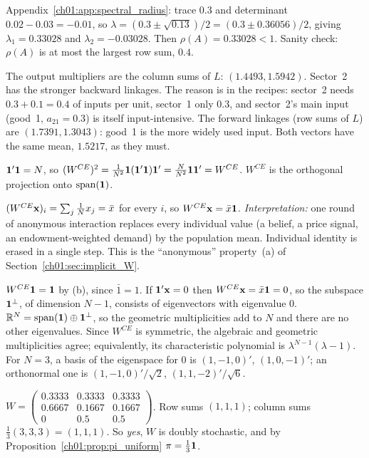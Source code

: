 \documentclass[../solutions_manual.tex]{subfiles}
\begin{document}
 Appendix~\ref{ch01:app:spectral_radius}: trace $0.3$ and determinant $0.02 - 0.03 = -0.01$, so $\lambda = (0.3 \pm \sqrt{0.13})/2 = (0.3 \pm 0.36056)/2$, giving $\lambda_1 = 0.33028$ and $\lambda_2 = -0.03028$. Then $\rho(A) = 0.33028 < 1$. Sanity check: $\rho(A)$ is at most the largest row sum, $0.4$.

 The output multipliers are the column sums of $L$: $(1.4493, 1.5942)$. Sector~2 has the stronger backward linkages. The reason is in the recipes: sector~2 needs $0.3 + 0.1 = 0.4$ of inputs per unit, sector~1 only $0.3$, and sector~2's main input (good~1, $a_{21} = 0.3$) is itself input-intensive. The forward linkages (row sums of $L$) are $(1.7391, 1.3043)$: good~1 is the more widely used input. Both vectors have the same mean, $1.5217$, as they must.


 $\mathbf{1}'\mathbf{1} = N$, so $(W^{CE})^2 = \frac{1}{N^2}\mathbf{1}(\mathbf{1}'\mathbf{1})\mathbf{1}' = \frac{N}{N^2}\mathbf{1}\mathbf{1}' = W^{CE}$. $W^{CE}$ is the orthogonal projection onto $\operatorname{span}(\mathbf{1})$.

 $(W^{CE}\mathbf{x})_i = \sum_j \frac1N x_j = \bar x$ for every $i$, so $W^{CE}\mathbf{x} = \bar x\mathbf{1}$. \emph{Interpretation:} one round of anonymous interaction replaces every individual value (a belief, a price signal, an endowment-weighted demand) by the population mean. Individual identity is erased in a single step. This is the ``anonymous'' property~(a) of Section~\ref{ch01:sec:implicit_W}.

 $W^{CE}\mathbf{1} = \mathbf{1}$ by (b), since $\bar 1 = 1$. If $\mathbf{1}'\mathbf{x} = 0$ then $W^{CE}\mathbf{x} = \bar x\mathbf{1} = 0$, so the subspace $\mathbf{1}^\perp$, of dimension $N-1$, consists of eigenvectors with eigenvalue 0. $\mathbb{R}^N = \operatorname{span}(\mathbf{1}) \oplus \mathbf{1}^\perp$, so the geometric multiplicities add to $N$ and there are no other eigenvalues. Since $W^{CE}$ is symmetric, the algebraic and geometric multiplicities agree; equivalently, its characteristic polynomial is $\lambda^{N-1}(\lambda - 1)$. For $N = 3$, a basis of the eigenspace for 0 is $(1, -1, 0)'$, $(1, 0, -1)'$; an orthonormal one is $(1,-1,0)'/\sqrt2$, $(1,1,-2)'/\sqrt6$.

 $W = \begin{pmatrix} 0.3333 & 0.3333 & 0.3333 \\ 0.6667 & 0.1667 & 0.1667 \\ 0 & 0.5 & 0.5\end{pmatrix}$. Row sums $(1,1,1)$; column sums $\frac13(3, 3, 3) = (1, 1, 1)$. So \emph{yes}, $W$ is doubly stochastic, and by Proposition~\ref{ch01:prop:pi_uniform} $\pi = \frac13\mathbf{1}$.
\end{document}
